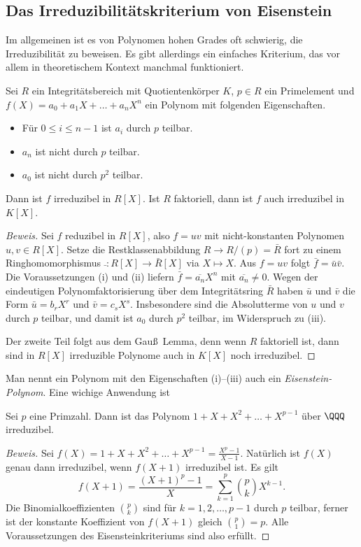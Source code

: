 \documentclass[12pt,a4paper,twoside]{article}
\newcommand{\ei}[1]{\emph{#1}\index{#1}}
\begin{document}
\subsection{Das Irreduzibilit\"atskriterium von Eisenstein}
Im allgemeinen ist es von Polynomen hohen Grades oft schwierig, die
Irreduzibilit\"at zu beweisen. Es gibt allerdings ein einfaches Kriterium, das
vor allem in theoretischem Kontext manchmal funktioniert.
\begin{Satz}[Eisenstein]
  Sei $R$ ein Integrit\"atsbereich mit Quotientenk\"orper $K$, $p\in R$ ein
  Primelement und $f(X)=a_0+a_1X+\dots+a_nX^n$ ein Polynom mit folgenden
  Eigenschaften.
  \begin{itemize}
  \item[(i)] F\"ur $0\le i\le n-1$ ist $a_i$ durch $p$ teilbar.
\item[(ii)] $a_n$ ist nicht durch $p$ teilbar.
\item[(iii)] $a_0$ ist nicht durch $p^2$ teilbar.
  \end{itemize}
  Dann ist $f$ irreduzibel in $R[X]$. Ist $R$ faktoriell, dann ist $f$ auch
  irreduzibel in $K[X]$.
\end{Satz}
\begin{proof}[Beweis]
  Sei $f$ reduzibel in $R[X]$, also $f=uv$ mit nicht-konstanten Polynomen
  $u,v\in R[X]$. Setze die Restklassenabbildung $R\to R/(p)=\bar R$ fort zu
  einem Ringhomomorphismus $\bar{}:R[X]\to \bar{R}[X]$ via $X\mapsto X$. Aus
  $f=uv$ folgt $\bar{f}=\bar{u}\bar{v}$. Die Voraussetzungen (i) und (ii)
  liefern $\bar{f}=\overline{a_n}X^n$ mit $\overline{a_n}\ne0$. Wegen der
  eindeutigen Polynomfaktorisierung \"uber dem Integrit\"atsring $\bar{R}$
  haben $\bar u$ und $\bar v$ die Form $\bar{u}=b_rX^r$ und $\bar{v}=c_sX^s$.
  Insbesondere sind die Absolutterme von $u$ und $v$ durch $p$ teilbar, und
  damit ist $a_0$ durch $p^2$ teilbar, im Widerspruch zu (iii).
  
  Der zweite Teil folgt aus dem Gau\ss\ Lemma, denn wenn $R$ faktoriell ist,
  dann sind in $R[X]$ irreduzible Polynome auch in $K[X]$ noch irreduzibel.
\end{proof}
Man nennt ein Polynom mit den Eigenschaften (i)--(iii) auch ein
\ei{Eisenstein-Polynom}. Eine wichige Anwendung ist
\begin{Satz}\label{S:Eisenstein2}
  Sei $p$ eine Primzahl. Dann ist das Polynom $1+X+X^2+\dots+X^{p-1}$ \"uber
  $\QQQ$ irreduzibel.
\end{Satz}
\begin{proof}[Beweis]
  Sei $f(X)=1+X+X^2+\dots+X^{p-1}=\frac{X^p-1}{X-1}$. Nat\"urlich ist $f(X)$
  genau dann irreduzibel, wenn $f(X+1)$ irreduzibel ist. Es gilt
\[
f(X+1)=\frac{(X+1)^p-1}{X}=\sum_{k=1}^p\binom{p}{k}X^{k-1}.
\]
Die Binomialkoeffizienten $\binom{p}{k}$ sind f\"ur $k=1,2,\dots,p-1$ durch
$p$ teilbar, ferner ist der konstante Koeffizient von $f(X+1)$ gleich
$\binom{p}{1}=p$. Alle Voraussetzungen des Eisensteinkriteriums sind also
erf\"ullt.
\end{proof}
\end{document}
